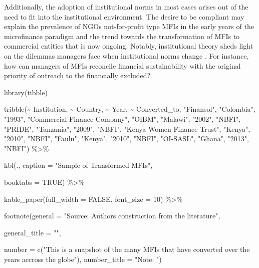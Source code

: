 \documentclass[a4paper,nobind]{templates/ociamthesis}
\newenvironment{Shaded}{\begin{snugshade}}{\end{snugshade}}
\newcommand{\AttributeTok}[1]{\textcolor[rgb]{0.77,0.63,0.00}{#1}}
\newcommand{\ConstantTok}[1]{\textcolor[rgb]{0.00,0.00,0.00}{#1}}
\newcommand{\DecValTok}[1]{\textcolor[rgb]{0.00,0.00,0.81}{#1}}
\newcommand{\FunctionTok}[1]{\textcolor[rgb]{0.00,0.00,0.00}{#1}}
\newcommand{\NormalTok}[1]{#1}
\newcommand{\SpecialCharTok}[1]{\textcolor[rgb]{0.00,0.00,0.00}{#1}}
\newcommand{\StringTok}[1]{\textcolor[rgb]{0.31,0.60,0.02}{#1}}
\renewenvironment{Shaded}
{
  \vspace{10pt}%
  \begin{snugshade}%
}{%
  \end{snugshade}%
  \vspace{8pt}%
}
\begin{document}
Additionally, the adoption of institutional norms in most cases arises out of the need to fit into the institutional environment. The desire to be compliant may explain the prevalence of NGOs not-for-profit type MFIs in the early years of the microfinance paradigm and the trend towards the transformation of MFIs to commercial entities that is now ongoing. Notably, institutional theory sheds light on the dilemmas managers face when institutional norms change \autocite{thornton2015institutional}. For instance, how can managers of MFIs reconcile financial sustainability with the original priority of outreach to the financially excluded?

\begin{Shaded}
\begin{Highlighting}[]
\FunctionTok{library}\NormalTok{(tibble)}

\FunctionTok{tribble}\NormalTok{(}\SpecialCharTok{\textasciitilde{}}\NormalTok{ Institution, }\SpecialCharTok{\textasciitilde{}}\NormalTok{ Country, }\SpecialCharTok{\textasciitilde{}}\NormalTok{ Year, }\SpecialCharTok{\textasciitilde{}}\NormalTok{ Converted\_to,}
        \StringTok{"Finansol"}\NormalTok{, }\StringTok{"Colombia"}\NormalTok{, }\StringTok{"1993"}\NormalTok{, }\StringTok{"Commercial Finance Company"}\NormalTok{,}
        \StringTok{"OIBM"}\NormalTok{, }\StringTok{"Malawi"}\NormalTok{, }\StringTok{"2002"}\NormalTok{, }\StringTok{"NBFI"}\NormalTok{,}
        \StringTok{"PRIDE"}\NormalTok{, }\StringTok{"Tanzania"}\NormalTok{, }\StringTok{"2009"}\NormalTok{, }\StringTok{"NBFI"}\NormalTok{,}
        \StringTok{"Kenya Women Finance Trust"}\NormalTok{, }\StringTok{"Kenya"}\NormalTok{, }\StringTok{"2010"}\NormalTok{, }\StringTok{"NBFI"}\NormalTok{,}
        \StringTok{"Faulu"}\NormalTok{, }\StringTok{"Kenya"}\NormalTok{, }\StringTok{"2010"}\NormalTok{, }\StringTok{"NBFI"}\NormalTok{,}
        \StringTok{"OI{-}SASL"}\NormalTok{, }\StringTok{"Ghana"}\NormalTok{, }\StringTok{"2013"}\NormalTok{, }\StringTok{"NBFI"}\NormalTok{) }\SpecialCharTok{\%\textgreater{}\%}
  
  \FunctionTok{kbl}\NormalTok{(., }\AttributeTok{caption =} \StringTok{"Sample of Transformed MFIs"}\NormalTok{, }
      
      \AttributeTok{booktabs =} \ConstantTok{TRUE}\NormalTok{) }\SpecialCharTok{\%\textgreater{}\%} 
  
  \FunctionTok{kable\_paper}\NormalTok{(}\AttributeTok{full\_width =} \ConstantTok{FALSE}\NormalTok{, }\AttributeTok{font\_size =} \DecValTok{10}\NormalTok{) }\SpecialCharTok{\%\textgreater{}\%} 
  
  \FunctionTok{footnote}\NormalTok{(}\AttributeTok{general =} \StringTok{"Source: Authors\textquotesingle{} construction from the literature"}\NormalTok{,}
           
           \AttributeTok{general\_title =} \StringTok{""}\NormalTok{,}
           
           \AttributeTok{number =} \FunctionTok{c}\NormalTok{(}\StringTok{"This is a snapshot of the many MFIs that have converted over the years accross the globe"}\NormalTok{),}
           \AttributeTok{number\_title =} \StringTok{"Note: "}\NormalTok{)}
\end{Highlighting}
\end{Shaded}
\end{document}
